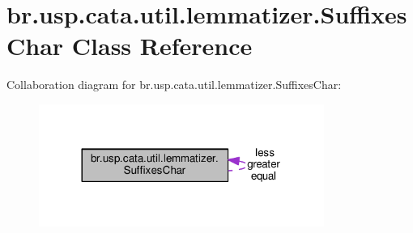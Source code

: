 \hypertarget{classbr_1_1usp_1_1cata_1_1util_1_1lemmatizer_1_1_suffixes_char}{\section{br.\+usp.\+cata.\+util.\+lemmatizer.\+Suffixes\+Char Class Reference}
\label{classbr_1_1usp_1_1cata_1_1util_1_1lemmatizer_1_1_suffixes_char}
}


Collaboration diagram for br.\+usp.\+cata.\+util.\+lemmatizer.\+Suffixes\+Char\+:\nopagebreak
\begin{figure}[H]
\begin{center}
\leavevmode
\includegraphics[width=264pt]{classbr_1_1usp_1_1cata_1_1util_1_1lemmatizer_1_1_suffixes_char__coll__graph}
\end{center}
\end{figure}
